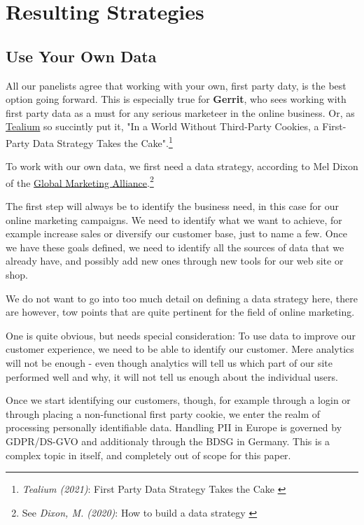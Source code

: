%
%

\pagebreak
\section{Resulting Strategies}

\onehalfspacing

\subsection{Use Your Own Data}

All our panelists agree that working with your own, first party daty, is the best option going forward. This is especially true for \textbf{Gerrit}, who sees working with first party data as a must for any serious marketeer in the online business. Or, as \href{https://tealium.com/}{Tealium} so succintly put it, "In a World Without Third-Party Cookies, a First-Party Data Strategy Takes the Cake".\footnote{\textit{Tealium (2021)}: First Party Data Strategy Takes the Cake \cite{firstCake}}

To work with our own data, we first need a data strategy, according to Mel Dixon of the \href{https://www.the-gma.com/}{Global Marketing Alliance}.\footnote{See \textit{Dixon, M. (2020)}: How to build a data strategy \cite{dataStrategy}}

The first step will always be to identify the business need, in this case for our online marketing campaigns. We need to identify what we want to achieve, for example increase sales or diversify our customer base, just to name a few. Once we have these goals defined, we need to identify all the sources of data that we already have, and possibly add new ones through new tools for our web site or shop.

We do not want to go into too much detail on defining a data strategy here, there are however, tow points that are quite pertinent for the field of online marketing.

One is quite obvious, but needs special consideration: To use data to improve our customer experience, we need to be able to identify our customer. Mere analytics will not be enough - even though analytics will tell us which part of our site performed well and why, it will not tell us enough about the individual users.

Once we start identifying our customers, though, for example through a login or through placing a non-functional first party cookie, we enter the realm of processing personally identifiable data. Handling PII in Europe is governed by GDPR/DS-GVO and additionaly through the BDSG in Germany. This is a complex topic in itself, and completely out of scope for this paper.


